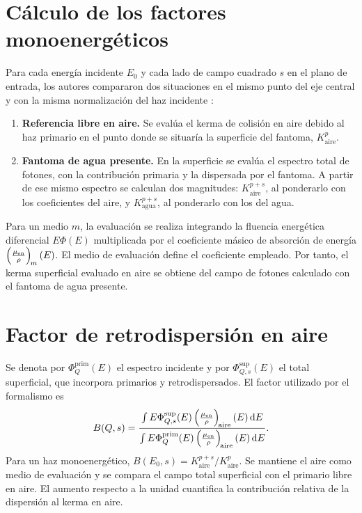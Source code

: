 \section{Cálculo de los factores monoenergéticos}
Para cada energía incidente $E_0$ y cada lado de campo cuadrado $s$ en el plano de entrada, los autores compararon dos situaciones en el mismo punto del eje central y con la misma normalización del haz incidente \citep{benreport,benarticle}:

\begin{enumerate}
\item \textbf{Referencia libre en aire.} Se evalúa el kerma de colisión en aire debido al haz primario en el punto donde se situaría la superficie del fantoma, $K_{\mathrm{aire}}^{p}$.
\item \textbf{Fantoma de agua presente.} En la superficie se evalúa el espectro total de fotones, con la contribución primaria y la dispersada por el fantoma. A partir de ese mismo espectro se calculan dos magnitudes: $K_{\mathrm{aire}}^{p+s}$, al ponderarlo con los coeficientes del aire, y $K_{\mathrm{agua}}^{p+s}$, al ponderarlo con los del agua.
\end{enumerate}

Para un medio $m$, la evaluación se realiza integrando la fluencia energética diferencial $E\Phi(E)$ multiplicada por el coeficiente másico de absorción de energía $\left(\frac{\mu_{\mathrm{en}}}{\rho}\right)_{\!m}(E)$. El medio de evaluación define el coeficiente empleado. Por tanto, el kerma superficial evaluado en aire se obtiene del campo de fotones calculado con el fantoma de agua presente.

\section{Factor de retrodispersión en aire}
Se denota por $\Phi^{\mathrm{prim}}_Q(E)$ el espectro incidente y por $\Phi^{\mathrm{sup}}_{Q,s}(E)$ el total superficial, que incorpora primarios y retrodispersados. El factor utilizado por el formalismo es
\begin{equation}\label{eq:bs}
B(Q,s)=\frac{\int E\Phi^{\mathrm{sup}}_{Q,s}(E)\left(\frac{\mu_{\mathrm{en}}}{\rho}\right)_{\!\mathrm{aire}}(E)\,\mathrm dE}
{\int E\Phi^{\mathrm{prim}}_Q(E)\left(\frac{\mu_{\mathrm{en}}}{\rho}\right)_{\!\mathrm{aire}}(E)\,\mathrm dE}.
\end{equation}
Para un haz monoenergético, $B(E_0,s)=K_{\mathrm{aire}}^{p+s}/K_{\mathrm{aire}}^{p}$. Se mantiene el aire como medio de evaluación y se compara el campo total superficial con el primario libre en aire. El aumento respecto a la unidad cuantifica la contribución relativa de la dispersión al kerma en aire.

